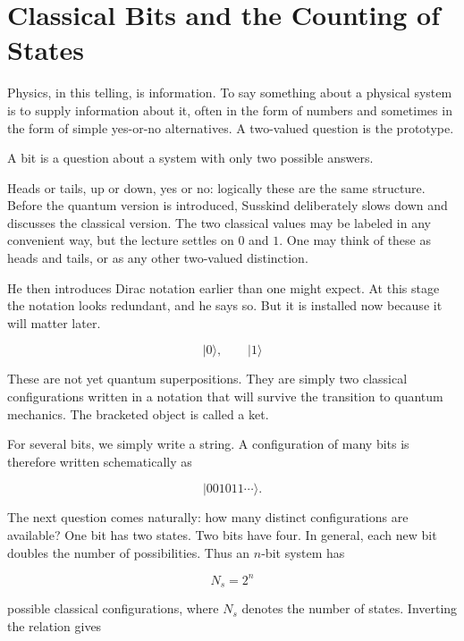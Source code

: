 \section{Classical Bits and the Counting of States}

Physics, in this telling, is information. To say something about a physical system is to supply information about it, often in the form of numbers and sometimes in the form of simple yes-or-no alternatives. A two-valued question is the prototype.

\begin{definition}
A bit is a question about a system with only two possible answers.
\end{definition}

Heads or tails, up or down, yes or no: logically these are the same structure. Before the quantum version is introduced, Susskind deliberately slows down and discusses the classical version. The two classical values may be labeled in any convenient way, but the lecture settles on \(0\) and \(1\). One may think of these as heads and tails, or as any other two-valued distinction.

He then introduces Dirac notation earlier than one might expect. At this stage the notation looks redundant, and he says so. But it is installed now because it will matter later.

\begin{equation}
|0\rangle,\qquad |1\rangle
\end{equation}

These are not yet quantum superpositions. They are simply two classical configurations written in a notation that will survive the transition to quantum mechanics. The bracketed object is called a ket.

For several bits, we simply write a string. A configuration of many bits is therefore written schematically as

\begin{equation}
|001011\cdots\rangle.
\end{equation}

The next question comes naturally: how many distinct configurations are available? One bit has two states. Two bits have four. In general, each new bit doubles the number of possibilities. Thus an \(n\)-bit system has

\begin{equation}
N_s = 2^n
\end{equation}

possible classical configurations, where \(N_s\) denotes the number of states. Inverting the relation gives


